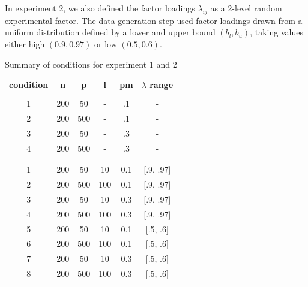 	In experiment 2, we also defined the factor loadings $\lambda_{ij}$ as a 2-level random experimental factor.
	The data generation step used factor loadings drawn from a uniform distribution defined by a lower and upper bound 
	$(b_l, b_u)$, taking values either high $(0.9, 0.97)$ or low $(0.5, 0.6)$.

\begin{table}[h]
   \begin{center}
        \begin{tabular}{ c c c c c c }
		\textbf{condition} & \textbf{n} & \textbf{p} & \textbf{l} & \textbf{pm} & \textbf{$\lambda$ range} \\ 
		\hline

		\rowcolor{Gray}
 		\multicolumn{6}{c}{Experiment 1} \\
		\hline

		1 & 200 & 50  & - & .1 & - \\
		2 & 200 & 500 & - & .1 & - \\
		3 & 200 & 50  & - & .3 & - \\
		4 & 200 & 500 & - & .3 & - \\

		\hline

		& & & & & \\ 

		\rowcolor{Gray}
 		\multicolumn{6}{c}{Experiment 2} \\
		\hline

		1 & 200 & 50 &  10 &  0.1 & [.9, .97] \\
		2 & 200 & 500 & 100 & 0.1 & [.9, .97] \\
		3 & 200 & 50 &  10 &  0.3 & [.9, .97] \\
		4 & 200 & 500 & 100 & 0.3 & [.9, .97] \\
		5 & 200 & 50 &  10 &  0.1 & [.5, .6]  \\
		6 & 200 & 500 & 100 & 0.1 & [.5, .6]  \\
		7 & 200 & 50 &  10 &  0.3 & [.5, .6]  \\
		8 & 200 & 500 & 100 & 0.3 & [.5, .6]  \\

		\hline
        \end{tabular}
    \end{center}
\caption{Summary of conditions for experiment 1 and 2} \label{table:condSum}
\end{table}

\FloatBarrier %


